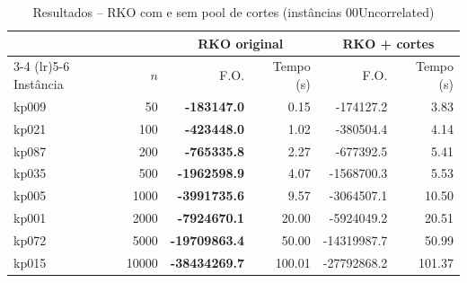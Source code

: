\begin{table}[htbp]
\centering
\caption{Resultados -- RKO com e sem pool de cortes (instâncias 00Uncorrelated)}
\label{tab:cuts}
\begin{tabular}{lrrrrr}
\toprule
 & & \multicolumn{2}{c}{\textbf{RKO original}} & \multicolumn{2}{c}{\textbf{RKO + cortes}} \\
\cmidrule(lr){3-4} \cmidrule(lr){5-6}
Instância & $n$ & F.O. & Tempo (s) & F.O. & Tempo (s) \\
\midrule
kp009 & 50 & \textbf{-183147.0} & 0.15 & -174127.2 & 3.83 \\
kp021 & 100 & \textbf{-423448.0} & 1.02 & -380504.4 & 4.14 \\
kp087 & 200 & \textbf{-765335.8} & 2.27 & -677392.5 & 5.41 \\
kp035 & 500 & \textbf{-1962598.9} & 4.07 & -1568700.3 & 5.53 \\
kp005 & 1000 & \textbf{-3991735.6} & 9.57 & -3064507.1 & 10.50 \\
kp001 & 2000 & \textbf{-7924670.1} & 20.00 & -5924049.2 & 20.51 \\
kp072 & 5000 & \textbf{-19709863.4} & 50.00 & -14319987.7 & 50.99 \\
kp015 & 10000 & \textbf{-38434269.7} & 100.01 & -27792868.2 & 101.37 \\
\bottomrule
\end{tabular}
\end{table}

